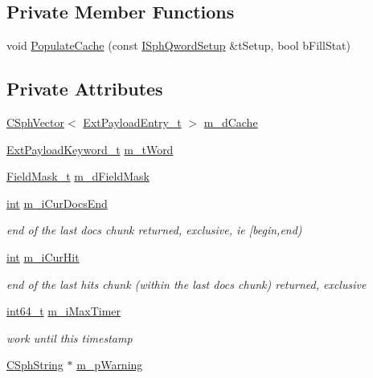\subsection*{Private Member Functions}
\begin{DoxyCompactItemize}
\item 
void \hyperlink{classExtPayload__c_aa12720cdd43d03be36567d44ba7d1c6e}{Populate\-Cache} (const \hyperlink{classISphQwordSetup}{I\-Sph\-Qword\-Setup} \&t\-Setup, bool b\-Fill\-Stat)
\end{DoxyCompactItemize}
\subsection*{Private Attributes}
\begin{DoxyCompactItemize}
\item 
\hyperlink{classCSphVector}{C\-Sph\-Vector}$<$ \hyperlink{structExtPayloadEntry__t}{Ext\-Payload\-Entry\-\_\-t} $>$ \hyperlink{classExtPayload__c_a14e70e413b0661e061307a8b5cf4371a}{m\-\_\-d\-Cache}
\item 
\hyperlink{structExtPayloadKeyword__t}{Ext\-Payload\-Keyword\-\_\-t} \hyperlink{classExtPayload__c_a7187e34956ba7f9bb8d55a9cf8c7c0fe}{m\-\_\-t\-Word}
\item 
\hyperlink{structFieldMask__t}{Field\-Mask\-\_\-t} \hyperlink{classExtPayload__c_a3b64211b124ac95030d03f65c84ba19d}{m\-\_\-d\-Field\-Mask}
\item 
\hyperlink{sphinxexpr_8cpp_a4a26e8f9cb8b736e0c4cbf4d16de985e}{int} \hyperlink{classExtPayload__c_a7f374e974aa7c12da38e4daec9489dc6}{m\-\_\-i\-Cur\-Docs\-End}
\begin{DoxyCompactList}\small\item\em end of the last docs chunk returned, exclusive, ie \mbox{[}begin,end) \end{DoxyCompactList}\item 
\hyperlink{sphinxexpr_8cpp_a4a26e8f9cb8b736e0c4cbf4d16de985e}{int} \hyperlink{classExtPayload__c_a83bcd96ecd069097e5ce0780f80d8536}{m\-\_\-i\-Cur\-Hit}
\begin{DoxyCompactList}\small\item\em end of the last hits chunk (within the last docs chunk) returned, exclusive \end{DoxyCompactList}\item 
\hyperlink{sphinxstd_8h_a996e72f71b11a5bb8b3b7b6936b1516d}{int64\-\_\-t} \hyperlink{classExtPayload__c_a413e80ba76fce68864326584a3621527}{m\-\_\-i\-Max\-Timer}
\begin{DoxyCompactList}\small\item\em work until this timestamp \end{DoxyCompactList}\item 
\hyperlink{structCSphString}{C\-Sph\-String} $\ast$ \hyperlink{classExtPayload__c_ab86bd34a7a3ccabfc3983f673e335431}{m\-\_\-p\-Warning}
\end{DoxyCompactItemize}
